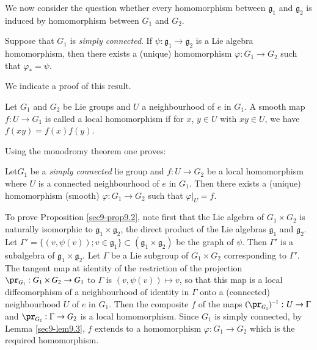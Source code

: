We now consider the question whether every homomorphism between $\mathfrak{g}_{1}$ and $\mathfrak{g}_{2}$ is induced by homomorphism between $G_{1}$ and $G_{2}$.

\begin{proposition}\label{sec9-prop9.2}
Suppose that $G_{1}$ is {\em simply connected}. If $\psi:\mathfrak{g}_{1}\to \mathfrak{g}_{2}$ is a Lie algebra homomorphism, then there exists a (unique) homomorphism $\varphi:G_{1}\to G_{2}$ such that $\varphi_{*}=\psi$.
\end{proposition}

We indicate a proof of this result.

\begin{defi*}
Let $G_{1}$ and $G_{2}$ be Lie groups and $U$ a neighbourhood of $e$ in $G_{1}$. A smooth map $f:U\to G_{1}$ is called a local homomorphism if for $x$, $y\in U$ with $xy\in U$, we have $f(xy)=f(x)f(y)$.
\end{defi*}

Using the monodromy theorem one proves:

\begin{lemma}\label{sec9-lem9.3}
Let\pageoriginale $G_{1}$ be a {\em simply connected} lie group and $f:U\to G_{2}$ be a local homomorphism where $U$ is a connected neighbourhood of $e$ in $G_{1}$. Then there exists a (unique) homomorphism (smooth) $\varphi:G_{1}\to G_{2}$ such that $\varphi|_{U}=f$.
\end{lemma}
 
To prove Proposition \ref{sec9-prop9.2}, note first that the Lie algebra of $G_{1}\times G_{2}$ is naturally isomorphic to $\mathfrak{g}_{1}\times \mathfrak{g}_{2}$, the direct product of the Lie algebras $\mathfrak{g}_{1}$ and $\mathfrak{g}_{2}$. Let $\Gamma'=\{(v,\psi(v)); v\in \mathfrak{g}_{1}\}\subset (\mathfrak{g}_{1}\times \mathfrak{g}_{2})$ be the graph of $\psi$. Then $\Gamma'$ is a subalgebra of $\mathfrak{g}_{1}\times \mathfrak{g}_{2}$. Let $\Gamma$ be a Lie subgroup of $G_{1}\times G_{2}$ corresponding to $\Gamma'$. The tangent map at identity of the restriction of the projection $\pr_{G_{1}}:G_{1}\times G_{2}\to G_{1}$ to $\Gamma$ is $(v,\psi(v))\mapsto v$, so that this map is a local diffeomorphism of a neighbourhood of identity in $\Gamma$ onto a (connected) neighbourhood $U$ of $e$ in $G_{1}$. Then the composite $f$ of the maps $(\pr_{G_{1}})^{-1}:U\to \Gamma$ and $\pr_{G_{2}}:\Gamma\to G_{2}$ is a local homomorphism. Since $G_{1}$ is simply connected, by Lemma \ref{sec9-lem9.3}, $f$ extends to a homomorphism $\varphi:G_{1}\to G_{2}$ which is the required homomorphism.

